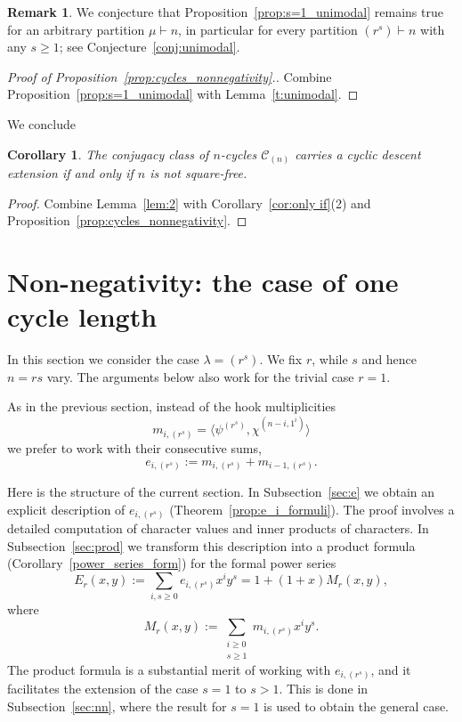\documentclass[10pt]{article}
\newtheorem{corollary}[theorem]{Corollary}
\theoremstyle{definition}
\newtheorem{remark}[theorem]{Remark}
\newcommand{\C}{\mathcal C}
\begin{document}
\begin{remark}
	We conjecture that Proposition~\ref{prop:s=1_unimodal} remains true for an arbitrary partition $\mu \vdash n$, in particular for every partition $(r^s) \vdash n$ with any	$s\ge 1$; see Conjecture~\ref{conj:unimodal}.
\end{remark}

\begin{proof}[Proof of Proposition~\ref{prop:cycles_nonnegativity}.]
    Combine Proposition~\ref{prop:s=1_unimodal} with   Lemma~\ref{t:unimodal}.
\end{proof}

We conclude 

\begin{corollary}\label{prop:CDE_cycles}
    The conjugacy class of $n$-cycles $\C_{(n)}$ carries a cyclic descent extension if and only if $n$ is not square-free.
\end{corollary}
	 
\begin{proof} 
    Combine Lemma~\ref{lem:2} with Corollary~\ref{cor:only if}(2) and Proposition~\ref{prop:cycles_nonnegativity}. 
\end{proof}


\section{Non-negativity: the case of one cycle length}
\label{sec:Witt}

In this section we consider the case $\lambda = (r^s)$. 
We fix $r$, while $s$ and hence $n=rs$ vary. 
The arguments below also work for the trivial case $r=1$.
		
As in the previous section, instead of the hook multiplicities 
\[
    m_{i,(r^s)} 
    = \langle \psi^{(r^s)}, \chi^{(n-i,1^i)} \rangle
\]
we prefer to work with their consecutive sums,
\[
    e_{i,(r^s)} := m_{i,(r^s)} + m_{i-1,(r^s)}.
\]
		
Here is the structure of the current section.
In Subsection~\ref{sec:e} 
we obtain an explicit description of $e_{i,(r^s)}$ (Theorem~\ref{prop:e_i_formuli}). The proof involves a detailed computation of character values and inner products of characters.
In Subsection~\ref{sec:prod} we 
transform this description into
a product formula (Corollary~\ref{power_series_form})
for the formal power series 
\[
E_r(x,y) 
:= \sum_{i,s \ge 0} e_{i,(r^s)} x^i y^s 
= 1 + (1 + x) M_r(x,y),  
\]
where 
\[
M_r(x,y) 
:= \sum_{\substack{i \ge 0 \\ s \ge 1}} m_{i,(r^s)} x^i y^s.
\]
The product formula is a substantial merit of working with $e_{i,(r^s)}$, and it facilitates the extension of the case $s=1$ to $s>1$. 
This is done in Subsection~\ref{sec:nn}, where the result for $s=1$ is used to obtain the general case.
		
\end{document}
